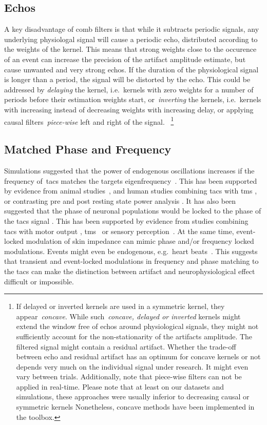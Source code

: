 \documentclass[a4paper]{article}
\begin{document}
\subsection{Echos}
A key disadvantage of comb filters is that while it subtracts periodic signals, any underlying physiologal signal will cause a periodic echo, distributed according to the weights of the kernel.
This means that strong weights close to the occurence of an event can increase the precision of the artifact amplitude estimate, but cause unwanted and very strong echos.
If the duration of the physiological signal is longer than a period, the signal will be distorted by the echo.
This could be addressed by \emph{delaying} the kernel, i.e.\ kernels with zero weights for a number of periods before their estimation weights start, or~\emph{inverting} the kernels, i.e.\ kernels with increasing instead of decreasing weights with increasing delay, or applying causal filters~\emph{piece-wise} left and right of the signal.
~\footnote{If delayed or inverted kernels are used in a symmetric kernel, they appear~\emph{concave}.
While such~\emph{concave, delayed or inverted} kernels might extend the window free of echos around physiological signals, they might not sufficiently account for the non-stationarity of the artifacts amplitude.
The filtered signal might contain a residual artifact.
Whether the trade-off between echo and residual artifact has an optimum for concave kernels or not depends very much on the individual signal under research. It might even vary between trials. Additionally, note that piece-wise filters can not be applied in real-time. Please note that at least on our datasets and simulations, these approaches were usually inferior to decreasing causal or symmetric kernels
Nonetheless, concave methods have been implemented in the toolbox.}

\subsection{Matched Phase and Frequency}
Simulations suggested that the power of endogenous oscillations increases if the frequency of~\gls{tacs} matches the targets eigenfrequency~\citep{Kutchko_2013,Zaehle_2010}.
This has been supported by evidence from animal studies~\citep{Schmidt_2014}, and human studies combining \gls{tacs} with \gls{tms} \citep{Guerra_2016}, or contrasting pre and post resting state power analysis \citep{Zaehle_2010}.
It has also been suggested that the phase of neuronal populations would be locked to the phase of the \gls{tacs} signal \citep{Reato_2013}. This has been supported by evidence from studies combining \gls{tacs} with motor output \citep{Brittain_2013}, \gls{tms}~\citep{Raco_2016,Nakazono_2016} or sensory perception~\citep{Gundlach_2016}.
At the same time, event-locked modulation of skin impedance can mimic phase and/or frequency locked modulations. Events might even be endogenous, e.g.\ heart beats~\citep{Noury_2016}.
This suggests that transient and event-locked modulations in frequency and phase matching to the \gls{tacs} can make the  distinction between artifact and neurophysiological effect  difficult or impossible.



\end{document}
